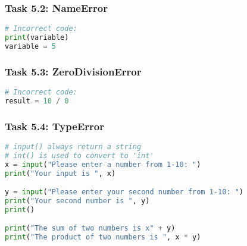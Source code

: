\documentclass[11pt]{article}
\begin{document}
\subsubsection*{Task 5.2: NameError}
\begin{lstlisting}[language=Python]
# Incorrect code:
print(variable)
variable = 5
\end{lstlisting}

\begin{tcolorbox}[colback=black!10!white, colframe=black!75!white, title=\textbf{Answer}]
    \vspace{1cm}
\end{tcolorbox}

\subsubsection*{Task 5.3: ZeroDivisionError}
\begin{lstlisting}[language=Python]
# Incorrect code:
result = 10 / 0 
\end{lstlisting}

\begin{tcolorbox}[colback=black!10!white, colframe=black!75!white, title=\textbf{Answer}]
    \vspace{1cm}
\end{tcolorbox}

\newpage

\subsubsection*{Task 5.4: TypeError}
\begin{lstlisting}[language=Python]
# input() always return a string
# int() is used to convert to 'int'
x = input("Please enter a number from 1-10: ")
print("Your input is ", x)

y = input("Please enter your second number from 1-10: ")
print("Your second number is ", y)
print()

print("The sum of two numbers is x" + y)
print("The product of two numbers is ", x * y)
\end{lstlisting}

\begin{tcolorbox}[colback=black!10!white, colframe=black!75!white, title=\textbf{Answer}]
    \vspace{5cm}
\end{tcolorbox}
\end{document}
